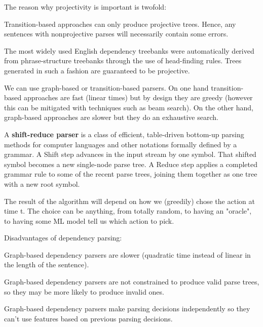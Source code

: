 \documentclass[12pt]{article}
\begin{document}
\par The reason why projectivity is important is twofold:
\olb
\item Transition-based approaches can only produce projective trees. Hence, any sentences with nonprojective parses will necessarily contain some errors.
\item The most widely used English dependency treebanks were automatically derived from phrase-structure treebanks through the use of head-finding rules. Trees generated in such a fashion are guaranteed to be projective.
\ole
\par We can use graph-based or transition-based parsers. On one hand transition-based approaches are fast (linear times) but by design they are greedy (however this can be mitigated with techniques such as beam search). On the other hand, graph-based approaches are slower but they do an exhaustive search.
\par A \textbf{shift-reduce parser} is a class of efficient, table-driven bottom-up parsing methods for computer languages and other notations formally defined by a grammar. A Shift step advances in the input stream by one symbol. That shifted symbol becomes a new single-node parse tree. A Reduce step applies a completed grammar rule to some of the recent parse trees, joining them together as one tree with a new root symbol.
\par The result of the algorithm will depend on how we (greedily) chose the action at time t. The choice can be anything, from totally random, to having an "oracle", to having some ML model tell us which action to pick.
\par Disadvantages of dependency parsing:
\ulb
\item Graph-based dependency parsers are slower (quadratic time instead of linear in the length of the sentence).
\item Graph-based dependency parsers are not constrained to produce valid parse trees, so they may be more likely to produce invalid ones.
\item Graph-based dependency parsers make parsing decisions independently so they can't use features based on previous parsing decisions.
\ule
\end{document}
